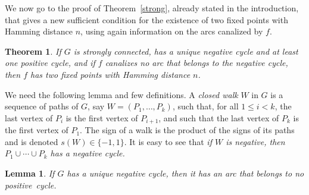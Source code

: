 \documentclass[11pt,a4paper]{article}
\newtheorem{lemma}{Lemma}
\newtheorem{theorem}{Theorem}
\begin{document}
We now go to the proof of Theorem~\ref{strong}, already stated in the introduction, that gives a new sufficient condition for the existence of two fixed points with Hamming distance $n$, using again information on the arcs canalized by $f$. 

\begin{theorem}
If $G$ is strongly connected, has a unique negative cycle and at least one positive cycle, and if $f$ canalizes no arc that belongs to the negative cycle, then $f$ has two fixed points with Hamming distance $n$. 
\end{theorem}

We need the following lemma and few definitions. A {\em closed walk} $W$ in $G$ is a sequence of paths of $G$, say $W=(P_1,\dots,P_k)$, such that, for all $1\leq i<k$, the last vertex of $P_i$ is the first vertex of $P_{i+1}$, and such that the last vertex of $P_k$ is the first vertex of $P_1$. The sign of a walk is the product of the signs of its paths and is denoted $s(W)\in\{-1,1\}$. It is easy to see that {\em if $W$ is negative, then $P_1\cup\cdots\cup P_k$ has a negative cycle.} 

\begin{lemma}\label{graph}
If $G$ has a unique negative cycle, then it has an arc that belongs to no positive~cycle. 
\end{lemma} 
\end{document}
